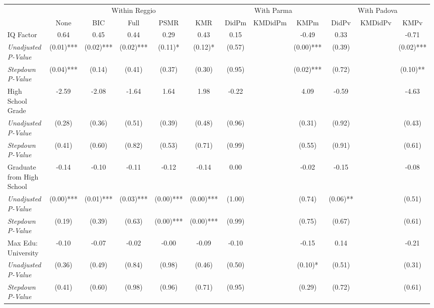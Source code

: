 \begin{tabular}{l c c c c c c c c c c c}
\toprule
& \multicolumn{5}{c}{Within Reggio} & \multicolumn{3}{c}{With Parma} & \multicolumn{3}{c}{With Padova} \\\cmidrule(lr){2-6} \cmidrule(lr){7-9} \cmidrule(lr){10-12}
 & None & BIC & Full & PSMR & KMR & DidPm & KMDidPm & KMPm & DidPv & KMDidPv & KMPv \\
\midrule
IQ Factor & 0.64 & 0.45 & 0.44 & 0.29 & 0.43 & 0.15 & & -0.49 & 0.33 & & -0.71 \\
\quad \textit{Unadjusted P-Value} & (0.01)*** & (0.02)*** & (0.02)*** & (0.11)* & (0.12)* & (0.57) & & (0.00)*** & (0.39) & & (0.02)*** \\
\quad \textit{Stepdown P-Value} & (0.04)*** & (0.14) & (0.41) & (0.37) & (0.30) & (0.95) & & (0.02)*** & (0.72) & & (0.10)** \\
High School Grade & -2.59 & -2.08 & -1.64 & 1.64 & 1.98 & -0.22 & & 4.09 & -0.59 & & -4.63 \\
\quad \textit{Unadjusted P-Value} & (0.28) & (0.36) & (0.51) & (0.39) & (0.48) & (0.96) & & (0.31) & (0.92) & & (0.43) \\
\quad \textit{Stepdown P-Value} & (0.41) & (0.60) & (0.82) & (0.53) & (0.71) & (0.99) & & (0.55) & (0.91) & & (0.61) \\
Graduate from High School & -0.14 & -0.10 & -0.11 & -0.12 & -0.14 & 0.00 & & -0.02 & -0.15 & & -0.08 \\
\quad \textit{Unadjusted P-Value} & (0.00)*** & (0.01)*** & (0.03)*** & (0.00)*** & (0.00)*** & (1.00) & & (0.74) & (0.06)** & & (0.51) \\
\quad \textit{Stepdown P-Value} & (0.19) & (0.39) & (0.63) & (0.00)*** & (0.00)*** & (0.99) & & (0.75) & (0.67) & & (0.61) \\
Max Edu: University & -0.10 & -0.07 & -0.02 & -0.00 & -0.09 & -0.10 & & -0.15 & 0.14 & & -0.21 \\
\quad \textit{Unadjusted P-Value} & (0.36) & (0.49) & (0.84) & (0.98) & (0.46) & (0.50) & & (0.10)* & (0.51) & & (0.31) \\
\quad \textit{Stepdown P-Value} & (0.41) & (0.60) & (0.98) & (0.96) & (0.71) & (0.95) & & (0.29) & (0.72) & & (0.61) \\
\bottomrule
\end{tabular}
